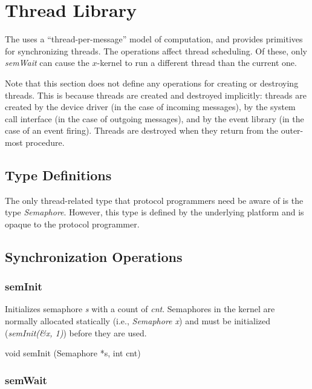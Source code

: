 % 
%
%

\section{Thread Library}
\label{thread}

The \xk{} uses a ``thread-per-message'' model of computation, and
provides primitives for synchronizing threads.  The operations affect
thread scheduling.  Of these, only {\em semWait}
can cause the $x$-kernel to run a different thread than the current one.

Note that this section does not define any operations for creating or
destroying threads. This is because \xk{} threads are created and
destroyed implicitly: threads are created by the device driver (in the
case of incoming messages), by the system call interface (in the case
of outgoing messages), and by the event library (in the case of an
event firing). Threads are destroyed when they return from the
outer-most procedure.

\subsection{Type Definitions}

The only thread-related type that protocol programmers need be
aware of is the type {\em Semaphore}. However, this type is defined
by the underlying platform and is opaque to the protocol programmer.

\subsection{Synchronization Operations}

\subsubsection{semInit}

Initializes semaphore {\em s} with a count of {\em cnt}.  Semaphores
in the kernel are normally allocated statically (i.e., {\em Semaphore
x}) and must be initialized ({\em semInit(\&x, 1)}) before they are
used.\medskip

{\sem void} {\bold semInit} ({\sem Semaphore}  *{\caps s}, {\sem int} {\caps cnt})\\

\subsubsection{semWait}

